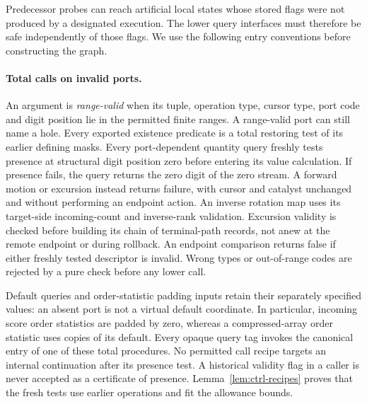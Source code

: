 Predecessor probes can reach artificial local states whose stored flags
were not produced by a designated execution.  The lower query interfaces
must therefore be safe independently of those flags.  We use the
following entry conventions before constructing the graph.

\paragraph{Total calls on invalid ports.}
An argument is \emph{range-valid} when its tuple, operation type,
cursor type, port code and digit position lie in the permitted finite ranges.
A range-valid port can still name a hole. Every exported existence
predicate is a total restoring test of its earlier defining masks.
Every port-dependent quantity query freshly tests presence at structural
digit position zero before entering its value calculation. If presence fails,
the query returns the zero digit of the zero stream. A forward motion
or excursion instead returns failure, with cursor and catalyst unchanged
and without performing an endpoint action. An inverse rotation map uses its
target-side incoming-count and inverse-rank validation. Excursion
validity is checked before building its chain of terminal-path records, not anew at the
remote endpoint or during rollback. An endpoint comparison returns
false if either freshly tested descriptor is invalid. Wrong types or
out-of-range codes are rejected by a pure check before any lower call.

Default queries and order-statistic padding inputs retain their separately
specified values: an absent port is not a virtual default coordinate.
In particular, incoming score order statistics are padded by zero, whereas a
compressed-array order statistic uses copies of its default. Every opaque query
tag invokes the canonical entry of one of these total procedures.
No permitted call recipe targets an internal continuation after its
presence test. A historical validity flag in a caller is never accepted
as a certificate of presence. Lemma~\ref{lem:ctrl-recipes} proves that
the fresh tests use earlier operations and fit the allowance bounds.

